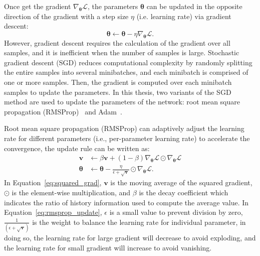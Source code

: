 Once get the gradient $\nabla_{\bm{\theta}}\mathcal{L}$, the parameters $\bm{\theta}$ can be updated in the opposite direction of the gradient with a step size $\eta$ (i.e. learning rate) via gradient descent:
\begin{equation}
    \bm{\theta} \leftarrow \bm{\theta} - \eta\nabla_{\bm{\theta}}\mathcal{L}.
\end{equation}
However, gradient descent requires the calculation of the gradient over all samples, and it is inefficient when the number of samples is large. Stochastic gradient descent (SGD) reduces computational complexity by randomly splitting the entire samples into several minibatches, and each minibatch is comprised of one or more samples. Then, the gradient is computed over each minibatch samples to update the parameters. 
In this thesis, two variants of the SGD method are used to update the parameters of the network: root mean square propagation (RMSProp)~\cite{tieleman2012lecture} and Adam~\cite{kingma2014adam}.

Root mean square propagation (RMSProp) can adaptively adjust the learning rate for different parameters (i.e., per-parameter learning rate) to accelerate the convergence, the update rule can be written as:
\begin{align}
    \mathbf{v} &\leftarrow \beta \mathbf{v} + (1 - \beta)\nabla_{\bm{\theta}}\mathcal{L}\odot\nabla_{\bm{\theta}}\mathcal{L} \label{eq:squared_grad}\\
     \bm{\theta} &\leftarrow \bm{\theta} - \frac{\eta}{\epsilon+\sqrt{\mathbf{v}}}\odot\nabla_{\bm{\theta}}\mathcal{L} \label{eq:rmsprop_update}.
\end{align}
In Equation~\eqref{eq:squared_grad}, $\mathbf{v}$ is the moving average of the squared gradient, $\odot$ is the element-wise multiplication, and $\beta$ is the decay coefficient which indicates the ratio of history information used to compute the average value. In Equation~\eqref{eq:rmsprop_update}, $\epsilon$ is a small value to prevent division by zero, $\frac{1}{(\epsilon + \sqrt{\mathbf{v}})}$ is the weight to balance the learning rate for individual parameter, in doing so, the learning rate for large gradient will decrease to avoid exploding, and the learning rate for small gradient will increase to avoid vanishing.

